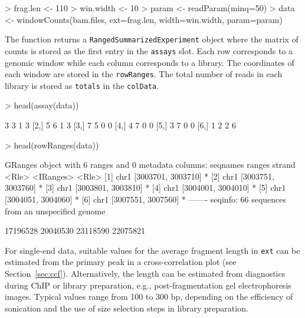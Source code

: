 \documentclass[12pt]{report}
\renewenvironment{Schunk}{\vspace{0pt}}{\vspace{0pt}}
\newcommand{\code}[1]{{\small\texttt{#1}}}
\begin{document}
\begin{Schunk}
\begin{Sinput}
> frag.len <- 110
> win.width <- 10
> param <- readParam(minq=50)
> data <- windowCounts(bam.files, ext=frag.len, width=win.width, param=param)
\end{Sinput}
\end{Schunk}

The function returns a \code{RangedSummarizedExperiment} object where the matrix of counts is stored as the first entry in the \code{assays} slot.
Each row corresponds to a genomic window while each column corresponds to a library.
The coordinates of each window are stored in the \code{rowRanges}.
The total number of reads in each library is stored as \code{totals} in the \code{colData}.

\begin{Schunk}
\begin{Sinput}
> head(assay(data))
\end{Sinput}
\begin{Soutput}
     [,1] [,2] [,3] [,4]
[1,]    3    3    1    3
[2,]    5    6    1    3
[3,]    7    5    0    0
[4,]    4    7    0    0
[5,]    3    7    0    0
[6,]    1    2    2    6
\end{Soutput}
\begin{Sinput}
> head(rowRanges(data))
\end{Sinput}
\begin{Soutput}
GRanges object with 6 ranges and 0 metadata columns:
      seqnames             ranges strand
         <Rle>          <IRanges>  <Rle>
  [1]     chr1 [3003701, 3003710]      *
  [2]     chr1 [3003751, 3003760]      *
  [3]     chr1 [3003801, 3003810]      *
  [4]     chr1 [3004001, 3004010]      *
  [5]     chr1 [3004051, 3004060]      *
  [6]     chr1 [3007551, 3007560]      *
  -------
  seqinfo: 66 sequences from an unspecified genome
\end{Soutput}
\begin{Soutput}
[1] 17196528 20040530 23118590 22075821
\end{Soutput}
\end{Schunk}

For single-end data, suitable values for the average fragment length in \code{ext} can be estimated from the primary peak in a cross-correlation plot (see Section~\ref{sec:ccf}). 
Alternatively, the length can be estimated from diagnostics during ChIP or library preparation, e.g., post-fragmentation gel electrophoresis images. 
Typical values range from 100 to 300 bp, depending on the efficiency of sonication and the use of size selection steps in library preparation.
\end{document}
